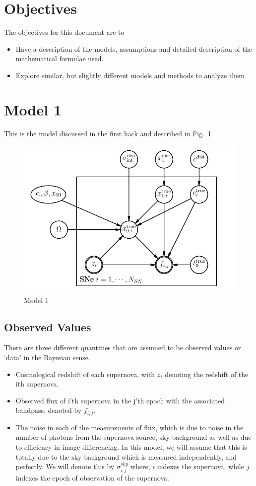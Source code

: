 \documentclass{article}[12pt]
\begin{document}
\section{Objectives}
The objectives for this document are to
\begin{itemize}
\item Have a description of the models, assumptions and detailed description of the mathematical formulae used. 
\item Explore similar, but slightly different models and methods to analyze them\end{itemize} 

\section{Model 1}
This is the model discussed in the first hack and described in Fig.~\ref{fig:model1} 
\begin{figure}[h]
\includegraphics{images/snpgm}
\caption{Model 1}
\label{fig:model1}
\end{figure}

\subsection{Observed Values}
There are three different quantities that are assumed to be observed values or 
`data' in the Bayesian sense.
\begin{itemize}
\item Cosmological redshift of each supernova, with $z_i$ denoting the redshift of the ith supernova.
\item Observed flux of i'th supernova in the j'th epoch with the associated bandpass, denoted by $f_{i,j}$.
\item The noise in each of the measurements of flux, which is due to noise in the number of photons from
the supernova-source, sky background as well as due to efficiency in image differencing. In this model, we will assume that this is totally due to the sky background which is measured independently, and perfectly. We will denote this by 
$\sigma^{sky}_{i,j}$ where, $i$ indexes the supernova, while $j$ indexes the epoch of observation of the supernova. 
\end{itemize}
\end{document}
